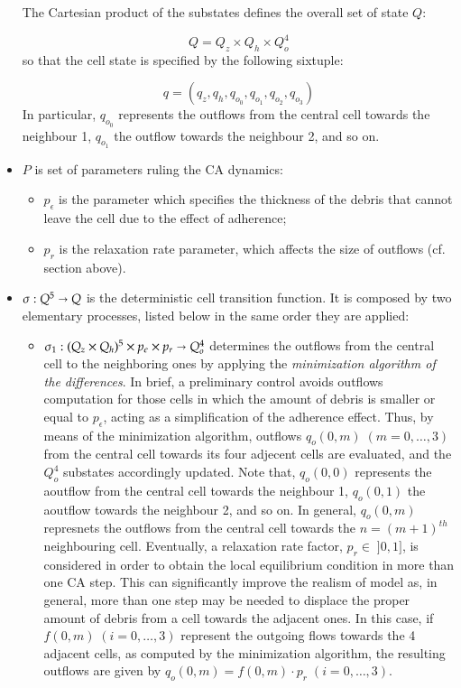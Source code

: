 \begin{itemize}
The Cartesian product of the substates defines the overall set of
state $Q$:

$$Q = Q_z \times Q_h \times Q_o^4$$
so that the cell state is specified by the following sixtuple:

$$ q = (q_z, q_h, q_{o_0}, q_{o_1}, q_{o_2}, q_{o_3})$$
In particular, $q_{o_0}$ represents the outflows from the central cell towards the neighbour 1, $q_{o_1}$ the outflow towards the neighbour 2, and so on.

\item   $P$ is set of parameters ruling the CA dynamics:

\begin{itemize}
    \item   $p_\epsilon$ is the parameter which specifies the thickness of the debris that cannot leave the cell due to the effect of adherence;
    \item   $p_r$ is the relaxation rate parameter, which affects the size of outflows (cf. section above).
\end{itemize}

\item $\sigma : Q^5 \shortrightarrow Q$ is the deterministic cell
  transition function. It is composed by two elementary processes,
  listed below in the same order they are applied:
\begin{itemize}
\item $\sigma_1 : (Q_z \times Q_h)^5 \times p_\epsilon \times
  p_r\shortrightarrow Q_o^4$ determines the outflows from the central
  cell to the neighboring ones by applying the \emph{minimization
    algorithm of the differences}. In brief, a preliminary control
  avoids outflows computation for those cells in which the amount of
  debris is smaller or equal to $p_\epsilon$, acting as a
  simplification of the adherence effect. Thus, by means of the
  minimization algorithm, outflows $q_o(0,m) \; (m=0,\ldots,3)$ from
  the central cell towards its four adjecent cells are evaluated, and
  the $Q_o^4$ substates accordingly updated. Note that, $q_o(0,0)$
  represents the aoutflow from the central cell towards the neighbour
  1, $q_o(0,1)$ the aoutflow towards the neighbour 2, and so on. In
  general, $q_o(0,m)$ represnets the outflows from the central cell
  towards the $n=(m+1)^{th}$ neighbouring cell. Eventually, a
  relaxation rate factor, $p_r \in \; ]0,1]$, is considered in order
      to obtain the local equilibrium condition in more than one CA
      step. This can significantly improve the realism of model as, in
      general, more than one step may be needed to displace the proper
      amount of debris from a cell towards the adjacent ones. In this
      case, if $f(0,m) \; (i=0, \ldots, 3)$ represent the outgoing
      flows towards the 4 adjacent cells, as computed by the
      minimization algorithm, the resulting outflows are given by
      $q_o(0,m)=f(0,m) \cdot p_r \; (i=0, \ldots, 3)$.


\end{itemize}
\end{itemize}

